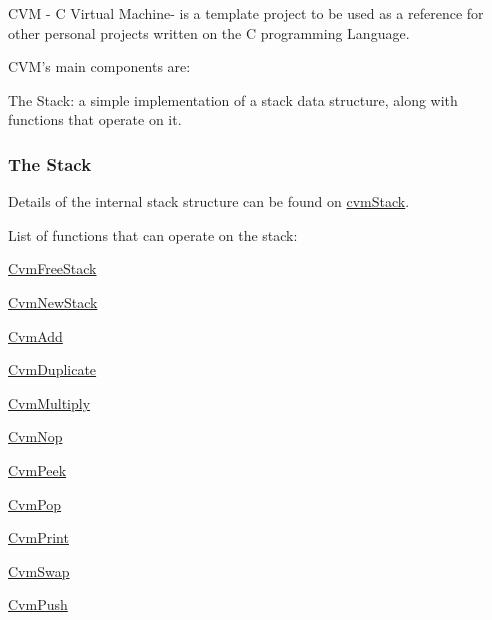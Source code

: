 C\-V\-M -\/ C Virtual Machine-\/ is a template project to be used as a reference for other personal projects written on the C programming Language.

C\-V\-M's main components are\-:


\begin{DoxyItemize}
\item The Stack\-: a simple implementation of a stack data structure, along with functions that operate on it.
\end{DoxyItemize}

\subsubsection*{The Stack}

Details of the internal stack structure can be found on \hyperlink{structcvm_stack}{cvm\-Stack}.

List of functions that can operate on the stack\-:


\begin{DoxyItemize}
\item \hyperlink{cvm_stack_8h_ac21cebea4878cfbe3bbcaf6261548472}{Cvm\-Free\-Stack}
\item \hyperlink{cvm_stack_8h_a9fe289d76b37e35577b065640539d8bc}{Cvm\-New\-Stack}
\item \hyperlink{cvm_stack_8h_aafe9f034e06531a239e94e5a48e55e1d}{Cvm\-Add}
\item \hyperlink{cvm_stack_8h_a57090dc684fbf5502dd5a7332d36dd72}{Cvm\-Duplicate}
\item \hyperlink{cvm_stack_8h_aeeeffa6e4c45d041acd46d773720b971}{Cvm\-Multiply}
\item \hyperlink{cvm_stack_8h_a2ad2b1dbd780411d0be96bc6b0fd22e1}{Cvm\-Nop}
\item \hyperlink{cvm_stack_8h_a42ee5037086d419ff3d036fbf85efe3a}{Cvm\-Peek}
\item \hyperlink{cvm_stack_8h_ab18c80e99469eb290511d6fbcfa99c90}{Cvm\-Pop}
\item \hyperlink{cvm_stack_8h_a69779b613c6e7e0e7a4db868a65e5cb5}{Cvm\-Print}
\item \hyperlink{_cvm_swap-example}{Cvm\-Swap}
\item \hyperlink{cvm_stack_8h_ab74f759234a988c2b608fb492521fb6b}{Cvm\-Push} 
\end{DoxyItemize}